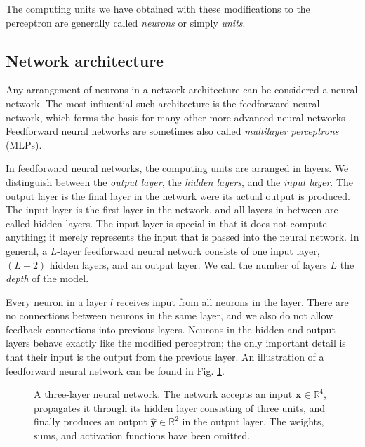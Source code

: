 The computing units we have obtained with these modifications to the perceptron are generally called \emph{neurons} or simply \emph{units}.

\subsection{Network architecture}
Any arrangement of neurons in a network architecture can be considered a neural network. The most influential such architecture is the feedforward neural network, which forms the basis for many other more advanced neural networks \cite[Ch.\,6,\,p.\,163]{DBLP:books/daglib/0040158}. Feedforward neural networks are sometimes also called \emph{multilayer perceptrons} (MLPs).

In feedforward neural networks, the computing units are arranged in layers. We distinguish between the \emph{output layer}, the \emph{hidden layers}, and the \emph{input layer}. The output layer is the final layer in the network were its actual output is produced. The input layer is the first layer in the network, and all layers in between are called hidden layers. The input layer is special in that it does not compute anything; it merely represents the input that is passed into the neural network. In general, a $L$-layer feedforward neural network consists of one input layer, $(L-2)$ hidden layers, and an output layer. We call the number of layers $L$ the \emph{depth} of the model.

Every neuron in a layer $l$ receives input from all neurons in the  layer. There are no connections between neurons in the same layer, and we also do not allow feedback connections into previous layers. Neurons in the hidden and output layers behave exactly like the modified perceptron; the only important detail is that their input is the output from the previous layer. An illustration of a feedforward neural network can be found in Fig. \ref{fig:network}.
\begin{figure}
	\begin{center}
		
	\end{center}
	\caption{A three-layer neural network. The network accepts an input $\bm{x} \in \mathbb{R}^4$, propagates it through its hidden layer consisting of three units, and finally produces an output $\hat{\bm{y}} \in \mathbb{R}^2$ in the output layer. The weights, sums, and activation functions have been omitted.}
	\label{fig:network}
\end{figure}

